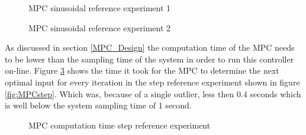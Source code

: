 
\begin{figure}[ht]
    \centering
    
    \caption{MPC sinusoidal reference experiment 1}
    \label{fig:MPCper1}
\end{figure}

\begin{figure}[ht]
    \centering
    
    \caption{MPC sinusoidal reference experiment 2}
    \label{fig:MPCper2}
\end{figure}

As discussed in section \ref{MPC_Design} the computation time of the MPC needs to be lower than the sampling time of the system in order to run this controller on-line. Figure \ref{fig:MPCcompTime} shows the time it took for the MPC to determine the next optimal input for every iteration in the step reference experiment shown in figure \ref{fig:MPCstep}. Which was, because of a single outlier, less then 0.4 seconds which is well below the system sampling time of 1 second. 
\begin{figure}[ht]
    \centering
    
    \caption{MPC computation time step reference experiment}
    \label{fig:MPCcompTime}
\end{figure}

